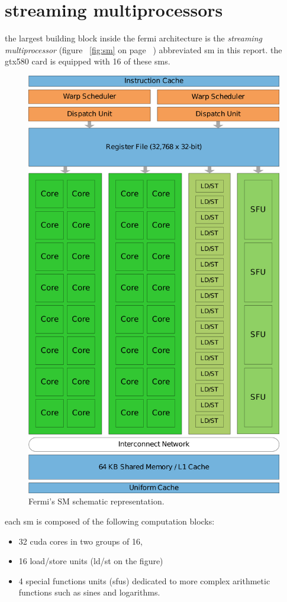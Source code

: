 \documentclass{report}
\begin{document}
    \section{streaming multiprocessors}
    the largest building block inside the fermi architecture is the 
    \emph{streaming multiprocessor} (figure ~\ref{fig:sm} on page 
    ~\pageref{fig:sm}) abbreviated sm in this report. the gtx580 card is equipped
    with 16 of these sms.
    \begin{figure}[h]
    \centering
        \includegraphics[width=0.75\linewidth]{pictures/fermi}
        \captionsetup{justification=centering}
        \caption{Fermi's SM schematic representation.\cite{fermiwhitepap}}
        \label{fig:SM}
    \end{figure}

    each sm is composed of the following computation blocks\cite{fermiwhitepap}:
    \begin{itemize}
        \item 32 cuda cores in two groups of 16,
        \item 16 load/store units (ld/st on the figure)
        \item 4 special functions units (sfus) dedicated to more complex
              arithmetic functions such as sines and logarithms.
    \end{itemize}
    
\end{document}
